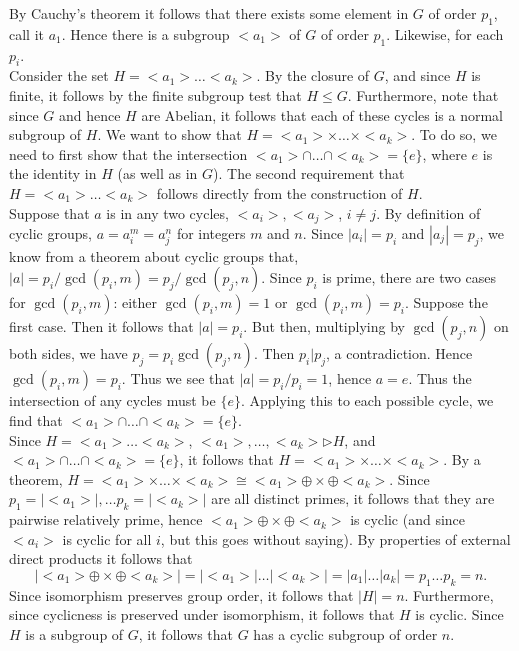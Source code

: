 \documentclass{article}
\begin{document}
By Cauchy's theorem it follows that there exists some element in $G$ of order $p_1$, call it $a_1$. Hence there is a subgroup $<a_1>$ of $G$ of order $p_1$. Likewise, for each $p_i$.\\

Consider the set $H = <a_1>\dots<a_k>$. By the closure of $G$, and since $H$ is finite, it follows by the finite subgroup test that $H\le G$. Furthermore, note that since $G$ and hence $H$ are Abelian, it follows that each of these cycles is a normal subgroup of $H$. We want to show that $H = <a_1>\times\dots\times<a_k>$. To do so, we need to first show that the intersection $<a_1>\cap\dots\cap<a_k> = \{e\}$, where $e$ is the identity in $H$ (as well as in $G$). The second requirement that $H = <a_1>\dots <a_k>$ follows directly from the construction of $H$.\\

Suppose that $a$ is in any two cycles, $<a_i>, <a_j>$, $i\ne j$. By definition of cyclic groups, $a = a_i^m = a_j^n$ for integers $m$ and $n$. Since $|a_i| = p_i$ and $|a_j|= p_j$, we know from a theorem about cyclic groups that, $|a| = p_i/\gcd(p_i,m) = p_j/\gcd(p_j,n)$. Since $p_i$ is prime, there are two cases for $\gcd(p_i, m)$: either $\gcd(p_i,m) = 1$ or $\gcd(p_i,m) = p_i$. Suppose the first case. Then it follows that $|a| = p_i$. But then, multiplying by $\gcd(p_j,n)$ on both sides, we have $p_j = p_i\gcd(p_j,n)$. Then $p_i|p_j$, a contradiction. Hence $\gcd(p_i,m) = p_i$. Thus we see that $|a| = p_i/p_i  = 1$, hence $a = e$. Thus the intersection of any cycles must be $\{e\}.$ Applying this to each possible cycle, we find that $<a_1>\cap\dots\cap<a_k> = \{e\}$. \\

Since $H = <a_1>\dots<a_k>$, $<a_1>,\dots,<a_k>\triangleright H$, and $<a_1>\cap\dots\cap<a_k> = \{e\}$, it follows that $H = <a_1>\times\dots\times <a_k>$. By a theorem, $H = <a_1>\times\dots\times<a_k> \cong <a_1>\oplus\times\oplus<a_k>$. Since $p_1 = |<a_1>|,\dots p_k = |<a_k>|$ are all distinct primes, it follows that they are pairwise relatively prime, hence $<a_1>\oplus\times\oplus<a_k>$ is cyclic (and since $<a_i>$ is cyclic for all $i$, but this goes without saying). By properties of external direct products it follows that 
$$|<a_1>\oplus\times\oplus<a_k>| = |<a_1>|\dots|<a_k>| = |a_1|\dots|a_k| = p_1\dots p_k = n.$$
Since isomorphism preserves group order, it follows that $|H| = n$. Furthermore, since cyclicness is preserved under isomorphism, it follows that $H$ is cyclic. Since $H$ is a subgroup of $G$, it follows that $G$ has a cyclic subgroup of order $n$.\\
\end{document}
